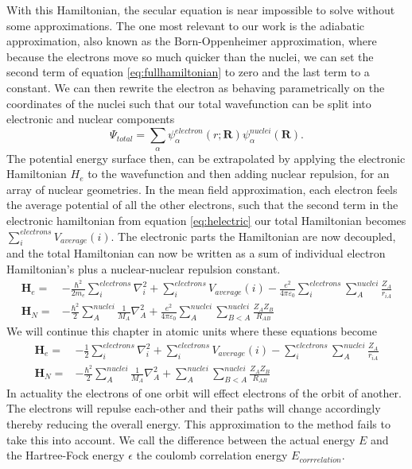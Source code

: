         With this Hamiltonian, the secular equation is near impossible to solve without some approximations.
        The one most relevant to our work is the adiabatic approximation, also known as the Born-Oppenheimer approximation, where because the electrons move so much quicker than the nuclei, we can set the second term of equation \ref{eq:fullhamiltonian} to zero and the last term to a constant. \cite{born1954dynamical,born1927quantentheorie}
        We can then rewrite the electron as behaving parametrically on the coordinates of the nuclei such that our total wavefunction can be split into electronic and nuclear components
        \begin{equation}
          \Psi_{total} = \sum_\alpha\psi_\alpha^{electron}(r;\mathbf{R})\psi_\alpha^{nuclei}(\mathbf{R}).
        \end{equation}
        The potential energy surface then, can be extrapolated by applying the electronic Hamiltonian $H_e$ to the wavefunction and then adding nuclear repulsion, for an array of nuclear geometries.
        In the mean field approximation, each electron feels the average potential of all the other electrons, such that the second term in the electronic hamiltonian from equation \ref{eq:helectric} our total Hamiltonian becomes $\sum_i^{electrons} V_{average}(i)$.
        The electronic parts the Hamiltonian are now decoupled, and the total Hamiltonian can now be written as a sum of individual electron Hamiltonian's plus a nuclear-nuclear repulsion constant.
        \begin{align}
          \label{eq:helectric}
          \mathbf{H}_e =& -\frac{\hbar^2}{2m_e}\sum_i^{electrons}\nabla_i^2 + \sum_i^{electrons} V_{average}(i) - \frac{e^2}{4\pi\varepsilon_0} \sum_i^{electrons}\sum_A^{nuclei}\frac{Z_A}{r_{iA}} \\
          \mathbf{H}_N =& -\frac{\hbar^2}{2}\sum_{A}^{nuclei}\frac{1}{M_{A}}\nabla_{A}^2  + \frac{e^2}{4\pi\varepsilon_0}\sum_{A}^{nuclei}\sum_{B<A}^{nuclei}\frac{Z_AZ_B}{R_{AB}}
        \end{align}
We will continue this chapter in atomic units where these equations become
        \begin{align}
          \label{eq:helectric}
          \mathbf{H}_e =& -\frac{1}{2}\sum_i^{electrons}\nabla_i^2 + \sum_i^{electrons} V_{average}(i) -  \sum_i^{electrons}\sum_A^{nuclei}\frac{Z_A}{r_{iA}} \\
          \mathbf{H}_N =& -\frac{\hbar^2}{2}\sum_{A}^{nuclei}\frac{1}{M_{A}}\nabla_{A}^2  + \sum_{A}^{nuclei}\sum_{B<A}^{nuclei}\frac{Z_AZ_B}{R_{AB}}
        \end{align}
        In actuality the electrons of one orbit will effect electrons of the orbit of another.
        The electrons will repulse each-other and their paths will change accordingly thereby reducing the overall energy.
        This approximation to the method fails to take this into account.
        We call the difference between the actual energy $E$ and the Hartree-Fock energy $\epsilon$ the
        coulomb correlation energy $E_{corrrelation}$.

